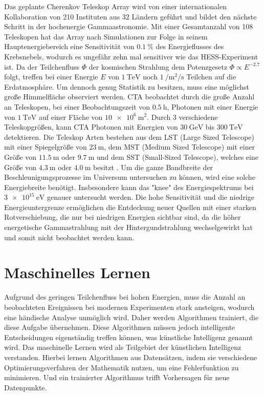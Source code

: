 Das geplante Cherenkov Teleskop Array wird von einer internationalen Kollaboration von 210 Instituten aus 32 Ländern\cite{CTA_consortium} geführt
und bildet den nächste Schritt in der hochenergie Gammaastronomie.
Mit einer Gesamtanzahl von 108 Teleskopen hat das Array nach Simulationen zur Folge in seinem Hauptenergiebereich eine Sensitivität von $\SI{0.1}{\percent}$
des Energieflusses des Krebsnebels, wodurch es ungefähr zehn mal sensitiver wie das HESS-Experiment ist\cite{CTA_paper}.
Da der Teilchenfluss $\Phi$ der kosmischen Strahlung dem Potenzgesetz $\Phi \propto E^{-2.7}$\cite[5]{Cosmic_rays} folgt,
treffen bei einer Energie $E$ von $\SI{1}{\tera\eV}$ noch $\SI{1}{\per\m\squared\per\s}$ Teilchen auf die Erdatmosphäre.
Um dennoch genug Statistik zu besitzen, muss eine möglichst große Himmelfläche observiert werden.
CTA beobachtet durch die große Anzahl an Teleskopen, bei einer Beobachtungszeit von $\SI{0.5}{\hour}$, Photonen mit einer Energie von $\SI{1}{\tera\eV}$ auf einer
Fläche von $\SI{10e6}{\m\squared}$\cite{CTA_ob}.
Durch 3 verschiedene Teleskopgrößen, kann CTA Photonen mit Energien von $\SI{30}{\giga\eV}$ bis $\SI{300}{\tera\eV}$ detektieren.
Die Teleskop Arten bestehen aus dem LST (Large Sized Telescope) mit einer Spiegelgröße von $\SI{23}{\m}$, dem MST (Medium Sized Telescope)
mit einer Größe von $\SI{11.5}{\m}$ oder $\SI{9.7}{\m}$ und dem SST (Small-Sized Telescope), welches eine Größe von $\SI{4.3}{\m}$ oder $\SI{4.0}{\m}$
besitzt\cite{CTA_tec} .
Um die ganze Bandbreite der Beschleunigungsprozesse im Universum untersuchen zu können, wird eine solche Energiebreite benötigt.
Insbesondere kann das "knee" des Energiespektrums bei $\SI{3e15}{\eV}$ genauer untersucht werden.
Die hohe Sensitivität und die niedrige Energieuntergrenze ermöglichen die Entdeckung neuer Quellen mit einer starken Rotverschiebung, die nur bei niedrigen
Energien sichtbar sind, da die höher energetische Gammastrahlung mit der Hintergundstrahlung wechselgewirkt hat und somit nicht beobachtet werden kann.

\section{Maschinelles Lernen}
\label{sec:ML}

Aufgrund des geringen Teilchenfluss bei hohen Energien, muss die Anzahl an beobachteten Ereignissen bei modernen
Experimenten stark ansteigen, wodurch eine händische Analyse unmöglich wird.
Daher werden Algorithmen trainiert, die diese Aufgabe übernehmen.
Diese Algorithmen müssen jedoch intelligente Entscheidungen eigenständig treffen können, was künstliche Intelligenz
genannt wird.
Das maschinelle Lernen wird als Teilgebiet der künstlichen Intelligenz verstanden. Hierbei lernen Algorithmen aus Datensätzen,
indem sie verschiedene Optimierungsverfahren der Mathematik nutzen, um eine Fehlerfunktion zu minimieren.
Und ein trainierter Algorithmus trifft Vorhersagen für neue Datenpunkte.

